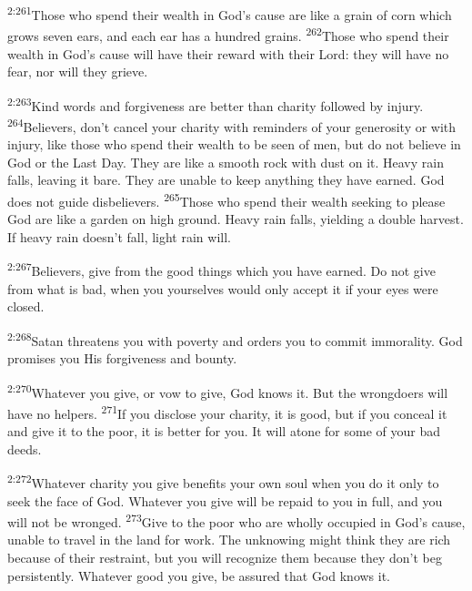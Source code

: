 \documentclass[openany,12pt,english]{book}
\newenvironment{para}{\par\pretolerance=100\tolerance=200\setlength{\emergencystretch}{0.6em}\relax}{\par}
\begin{document}
\begin{para}
    \textsuperscript{2:261}\thinspace{}Those who spend their wealth in God's cause are like a grain of corn which grows sev\-en ears, and each ear has a hun\-dred grains.
    \textsuperscript{262}\thinspace{}Those who spend their wealth in God's cause will have their re\-ward with their Lord: they will have no fear, nor will they grieve.
\end{para}

\begin{para}
    \textsuperscript{2:263}\thinspace{}Kind words and for\-give\-ness are bet\-ter than char\-i\-ty followed by in\-ju\-ry.
    \textsuperscript{264}\thinspace{}Believers, don't can\-cel your char\-i\-ty with reminders of your gen\-er\-os\-i\-ty or with in\-ju\-ry, like those who spend their wealth to be seen of men, but do not be\-lieve in God or the Last Day. They are like a smooth rock with dust on it. Heav\-y rain falls, leav\-ing it bare. They are un\-a\-ble to keep any\-thing they have earned. God does not guide disbelievers.
    \textsuperscript{265}\thinspace{}Those who spend their wealth seek\-ing to please God are like a gar\-den on high ground. Heav\-y rain falls, yield\-ing a dou\-ble har\-vest. If heav\-y rain does\-n't fall, light rain will.
\end{para}

\begin{para}
    \textsuperscript{2:267}\thinspace{}Believers, give from the good things which you have earned. Do not give from what is bad, when you your\-selves would on\-ly ac\-cept it if your eyes were closed.
\end{para}

\begin{para}
    \textsuperscript{2:268}\thinspace{}Satan threatens you with pov\-er\-ty and orders you to com\-mit im\-mo\-ral\-i\-ty. God promises you His for\-give\-ness and boun\-ty.
\end{para}

\begin{para}
    \textsuperscript{2:270}\thinspace{}What\-ev\-er you give, or vow to give, God knows it. But the wrongdoers will have no helpers.
    \textsuperscript{271}\thinspace{}If you dis\-close your char\-i\-ty, it is good, but if you con\-ceal it and give it to the poor, it is bet\-ter for you. It will a\-tone for some of your bad deeds.
\end{para}

\begin{para}
    \textsuperscript{2:272}\thinspace{}What\-ev\-er char\-i\-ty you give benefits your own soul when you do it on\-ly to seek the face of God. What\-ev\-er you give will be repaid to you in full, and you will not be wronged.
    \textsuperscript{273}\thinspace{}Give to the poor who are whol\-ly occupied in God's cause, un\-a\-ble to trav\-el in the land for work. The un\-know\-ing might think they are rich be\-cause of their re\-straint, but you will rec\-og\-nize them be\-cause they don't beg per\-sist\-ent\-ly. What\-ev\-er good you give, be as\-sured that God knows it.
\end{para}
\end{document}
